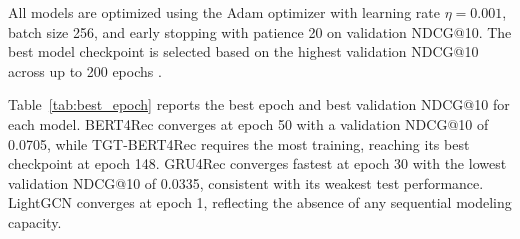 \documentclass[12pt,a4paper]{report}
\newcommand{\parencite}[1]{\citep{#1}}
\begin{document}
\begin{table}[h]
\centering
\caption{Hyperparameter settings for all models}
\label{tab:hyperparams_ch3}
\renewcommand{\arraystretch}{1.3}
\end{table}

All models are optimized using the Adam optimizer with learning rate \(\eta = 0.001\), batch size 256, and early stopping with patience 20 on validation NDCG@10. The best model checkpoint is selected based on the highest validation NDCG@10 across up to 200 epochs \parencite{ouledmeriem2025hybrid}.

Table~\ref{tab:best_epoch} reports the best epoch and best validation NDCG@10 for each model. BERT4Rec converges at epoch 50 with a validation NDCG@10 of 0.0705, while TGT-BERT4Rec requires the most training, reaching its best checkpoint at epoch 148. GRU4Rec converges fastest at epoch 30 with the lowest validation NDCG@10 of 0.0335, consistent with its weakest test performance. LightGCN converges at epoch 1, reflecting the absence of any sequential modeling capacity.
\end{document}
